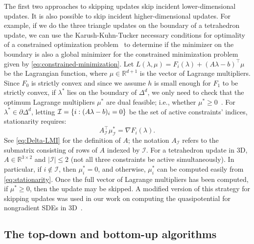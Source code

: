 \documentclass[eikonal.tex]{subfiles}
\begin{document}
The first two approaches to skipping updates skip incident
lower-dimensional updates. It is also possible to skip incident
higher-dimensional updates. For example, if we do the three triangle
updates on the boundary of a tetrahedron update, we can use the
Karush-Kuhn-Tucker necessary conditions for optimality of a
constrained optimization problem~\cite{nocedal2006numerical} to
determine if the minimizer on the boundary is also a global minimizer
for the constrained minimization problem given by
\cref{eq:constrained-minimization}. Let
$L(\lambda, \mu) = F_i(\lambda) + (A\lambda - b)^\top \mu$ be the
Lagrangian function, where $\mu \in \mathbb{R}^{d + 1}$ is the vector
of Lagrange multipliers. Since $F_0$ is strictly convex and since we
assume $h$ is small enough for $F_1$ to be strictly convex, if
$\lambda^*$ lies on the boundary of $\Delta^d$, we only need to check
that the optimum Lagrange multipliers $\mu^*$ are dual feasible; i.e.,
whether
$\mu^* \geq 0$~\cite{bertsekas1999nonlinear,nocedal2006numerical}. For
$\lambda^* \in \partial \Delta^d$, letting
$\mathcal{I} = \left\{i : (A\lambda - b)_i = 0\right\}$ be the set of active
constraints' indices, stationarity requires:
\begin{equation}\label{eq:stationarity}
  A^\top_{\mathcal{I}} \mu_{\mathcal{I}}^* = \nabla F_i(\lambda).
\end{equation}
See \cref{eq:Delta-LMI} for the definition of $A$; the notation
$A_{\mathcal{I}}$ refers to the submatrix consisting of rows of $A$
indexed by $\mathcal{I}$. For a tetrahedron update in 3D,
$A \in \mathbb{R}^{3 \times 2}$ and $|\mathcal{I}| \leq 2$ (not all
three constraints be active simultaneously). In particular, if
$i \notin \mathcal{I}$, then $\mu_i^* = 0$, and otherwise, $\mu_i^*$
can be computed easily from \cref{eq:stationarity}. Once the full
vector of Lagrange multipliers has been computed, if $\mu^* \geq 0$,
then the update may be skipped. A modified version of this strategy
for skipping updates was used in our work on computing the
quasipotential for nongradient SDEs in 3D~\cite{yang2019computing}.

\subsection{The top-down and bottom-up algorithms}
\end{document}
